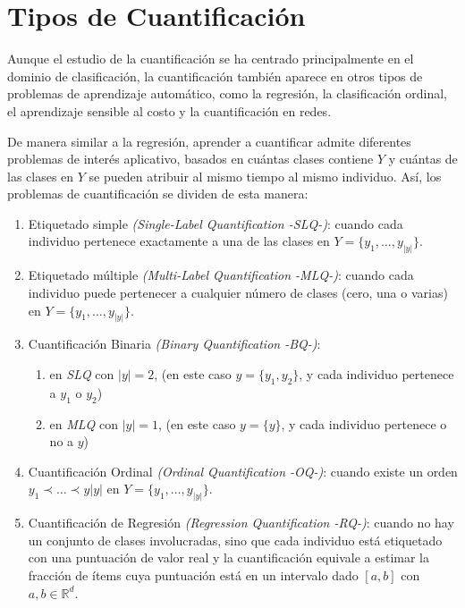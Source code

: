 \section{Tipos de Cuantificación}

Aunque el estudio de la cuantificación se ha centrado principalmente en el
dominio de clasificación, la cuantificación también aparece en otros tipos de
problemas de aprendizaje automático, como la regresión, la clasificación
ordinal, el aprendizaje sensible al costo y la cuantificación en redes.

De manera similar a la regresión, aprender a cuantificar admite diferentes
problemas de interés aplicativo, basados en cuántas clases contiene $Y$ y
cuántas de las clases en $Y$ se pueden atribuir al mismo tiempo al mismo
individuo. Así, los problemas de cuantificación se dividen de esta manera:

\begin{enumerate}
    \item Etiquetado simple {\it (Single-Label Quantification -SLQ-)\/}: cuando
    cada individuo pertenece exactamente a una de las clases en
    $Y=\{y_1,\dots,y_{|y|}\}$.
    \item Etiquetado múltiple {\it (Multi-Label Quantification -MLQ-)\/}: cuando
    cada individuo puede pertenecer a cualquier número de clases (cero, una o
    varias) en $Y=\{y_1,\dots,y_{|y|}\}$.
    \item Cuantificación Binaria {\it (Binary Quantification -BQ-)\/}:
    \begin{enumerate}
        \item en {\it SLQ\/} con $|y|=2$, (en este caso $y=\{y_1,y_2\}$, y cada
        individuo pertenece a $y_1$ o $y_2$)
        \item en {\it MLQ\/} con $|y|=1$, (en este caso $y=\{y\}$, y cada
        individuo pertenece o no a $y$)
    \end{enumerate}
    \item Cuantificación Ordinal {\it (Ordinal Quantification -OQ-)\/}: cuando
    existe un orden $y_1 \prec \dots \prec y|y|$ en $Y=\{y_1,\dots,y_{|y|}\}$.
    \item Cuantificación de Regresión {\it (Regression Quantification -RQ-)\/}:
    cuando no hay un conjunto de clases involucradas, sino que cada individuo
    está etiquetado con una puntuación de valor real y la cuantificación
    equivale a estimar la fracción de ítems cuya puntuación está en un intervalo
    dado $[a, b]$ con ${a, b \in \mathbb{R}^d}$.
\end{enumerate}

